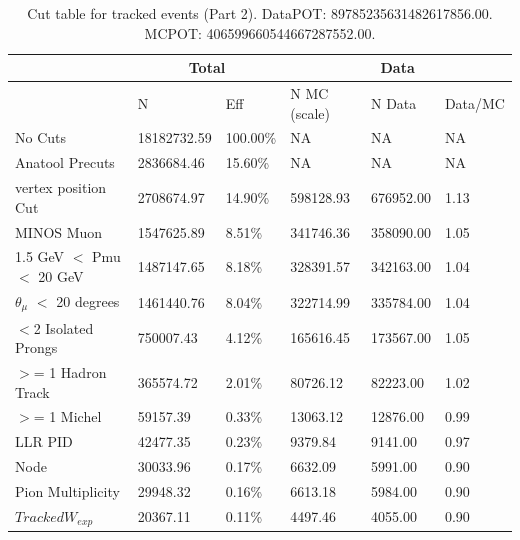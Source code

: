 \begin{table}[!hbt]
    \tiny
    \centering
    \begin{tabular}{|*{6}{l|}}


    \hline
    & \multicolumn{2}{c|}{Total} & \multicolumn{3}{c|}{Data} \\
    \hline
&  N         & Eff     & N MC (scale) & N Data    & Data/MC \\\hline

 No Cuts   & 18182732.59 & 100.00\% & NA & NA & NA \\ \hline
 Anatool Precuts & 2836684.46 &  15.60\% & NA & NA & NA \\ \hline
 vertex position Cut   & 2708674.97     &  14.90\% & 598128.93     & 676952.00 &   1.13 \\ \hline
 MINOS Muon  & 1547625.89     &   8.51\% & 341746.36     & 358090.00 &   1.05 \\ \hline
 1.5 GeV $<$ Pmu $<$ 20 GeV   & 1487147.65     &   8.18\% & 328391.57     & 342163.00 &   1.04 \\ \hline
 $\theta_{\mu}$ $<$ 20 degrees   & 1461440.76     &   8.04\% & 322714.99     & 335784.00 &   1.04 \\ \hline
 $<$2 Isolated Prongs   & 750007.43     &   4.12\% & 165616.45     & 173567.00 &   1.05 \\ \hline
 $>$= 1 Hadron Track  & 365574.72     &   2.01\% & 80726.12     & 82223.00 &   1.02 \\ \hline
 $>$= 1 Michel   & 59157.39     &   0.33\% & 13063.12     & 12876.00 &   0.99 \\ \hline
 LLR PID  & 42477.35     &   0.23\% & 9379.84     & 9141.00 &   0.97 \\ \hline
 Node  & 30033.96     &   0.17\% & 6632.09     & 5991.00 &   0.90 \\ \hline
 Pion Multiplicity   & 29948.32     &   0.16\% & 6613.18     & 5984.00 &   0.90 \\ \hline
 $Tracked W_{exp}$  & 20367.11     &   0.11\% & 4497.46     & 4055.00 &   0.90 \\ \hline
    \end{tabular}
    \caption{Cut table for tracked events (Part 2). DataPOT: 89785235631482617856.00. MCPOT: 406599660544667287552.00.}
    \label{tab:Analysis:Cuts:TrackedCutTable2}
\end{table}


\pagebreak

